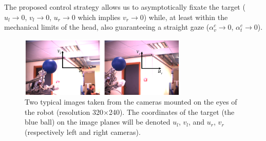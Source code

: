 The proposed control strategy allows us to asymptotically fixate the target 
($u_l \rightarrow 0$, $v_l \rightarrow 0$, $u_r \rightarrow 0$ which 
implies $v_r \rightarrow 0$) while, at least within the mechanical limits 
of the head, also guaranteeing a straight gaze 
($\alpha_v^c \rightarrow 0$, $\alpha_t^c \rightarrow 0$). 

\begin{figure}[tbp]
\centering
\includegraphics[width=8cm]{Figure/hand.eps}
\caption{Two typical images taken from the cameras mounted on the 
eyes of the robot (resolution 320$\times$240).
The coordinates of the target (the blue ball) on the image planes
will be denoted $u_l$, $v_l$, and $u_r$, $v_r$ (respectively left 
and right cameras).}
\label{Fig:ImagePlane}
\end{figure}
